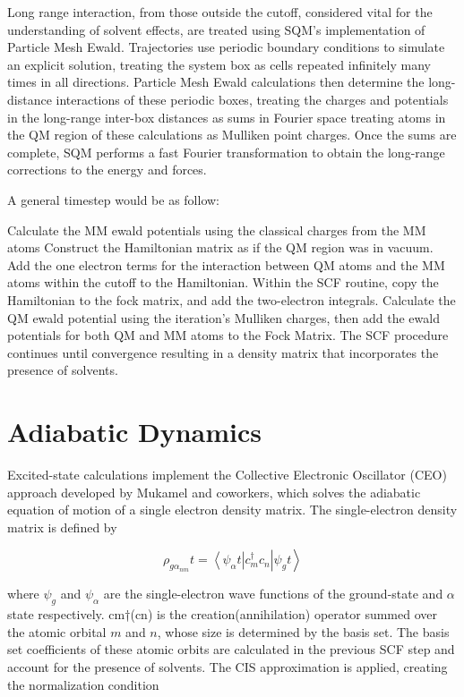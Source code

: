     Long range interaction, from those outside the cutoff, considered vital for the understanding of solvent effects, are treated using SQM’s implementation of Particle Mesh Ewald.
    Trajectories use periodic boundary conditions to simulate an explicit solution, treating the system box as cells repeated infinitely many times in all directions.
    Particle Mesh Ewald calculations then determine the long-distance interactions of these periodic boxes, treating the charges and potentials in the long-range inter-box distances as sums in Fourier space treating atoms in the QM region of these calculations as Mulliken point charges.
    Once the sums are complete, SQM performs a fast Fourier transformation to obtain the long-range corrections to the energy and forces.  

    A general timestep would be as follow: 

    Calculate the MM ewald potentials using the classical charges from the MM atoms Construct the Hamiltonian matrix as if the QM region was in vacuum.
    Add the one electron terms for the interaction between QM atoms and the MM atoms within the cutoff to the Hamiltonian.
    Within the SCF routine, copy the Hamiltonian to the fock matrix, and add the two-electron integrals.
    Calculate the QM ewald potential using the iteration’s Mulliken charges, then add the ewald potentials for both QM and MM atoms to the Fock Matrix.
    The SCF procedure continues until convergence resulting in a density matrix that incorporates the presence of solvents.

\section{Adiabatic Dynamics}
	Excited-state calculations implement the Collective Electronic Oscillator (CEO) approach developed by Mukamel and coworkers, which solves the adiabatic equation of motion of a single electron density matrix.
	The single-electron density matrix is defined by  

    \begin{equation}
	\rho_{g\alpha_{nm}}t = \left< \psi_\alpha t \right| c_m^\dagger c_n \left | \psi_g t \right>
    \end{equation}

    where \(\psi_g\) and \(\psi_\alpha\) are the single-electron wave functions of the ground-state and \(\alpha\) state respectively.
    cm†(cn) is the creation(annihilation) operator summed over the atomic orbital \(m\) and \(n\), whose size is determined by the basis set.
    The basis set coefficients of these atomic orbits are calculated in the previous SCF step and account for the presence of solvents.
    The CIS approximation is applied, creating the normalization condition 

